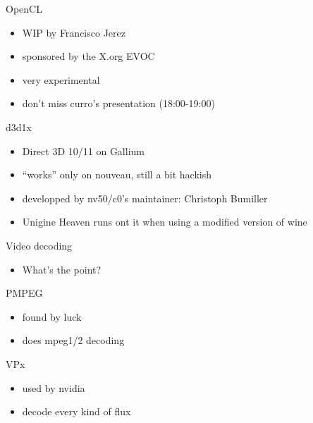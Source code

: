 \documentclass[11pt,english,compress]{beamer}
\begin{document}
		\begin{frame}
			\begin{block}{OpenCL}
				\begin{itemize}
					\item WIP by Francisco Jerez
					\item sponsored by the X.org EVOC
					\item very experimental
					\item don't miss curro's presentation (18:00-19:00)
				\end{itemize}
			\end{block}

			\begin{block}{d3d1x}
				\begin{itemize}
					\item Direct 3D 10/11 on Gallium
					\item ``works'' only on nouveau, still a bit hackish
					\item developped by nv50/c0's maintainer: Christoph Bumiller
					\item Unigine Heaven runs ont it when using a modified version of wine
				\end{itemize}
			\end{block}
		\end{frame}

		\begin{frame}
			\begin{block}{Video decoding}
				\begin{itemize}
					\item What's the point?
				\end{itemize}
			\end{block}

			\begin{block}{PMPEG}
				\begin{itemize}
					\item found by luck
					\item does mpeg1/2 decoding
				\end{itemize}
			\end{block}

			\begin{block}{VPx}
				\begin{itemize}
					\item used by nvidia
					\item decode every kind of flux
				\end{itemize}
			\end{block}
		\end{frame}
\end{document}

